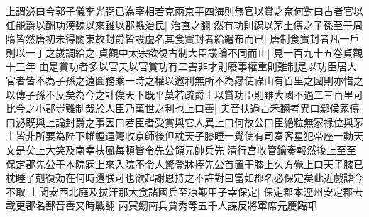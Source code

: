 上謂泌曰今郭子儀李光弼已為宰相若克兩京平四海則無官以賞之奈何對曰古者官以任能爵以酬功漢魏以來雖以郡縣治民|{
	治直之翻}
然有功則錫以茅土傳之子孫至于周隋皆然唐初未得關東故封爵皆設虚名其食實封者給繒布而已|{
	唐制食實封者凡一戶則以一丁之歲調給之}
貞觀中太宗欲復古制大臣議論不同而止|{
	見一百九十五卷貞觀十三年}
由是賞功者多以官夫以官賞功有二害非才則廢事權重則難制是以功臣居大官者皆不為子孫之遠圖務乘一時之權以邀利無所不為曏使祿山有百里之國則亦惜之以傳子孫不反矣為今之計俟天下既平莫若疏爵土以賞功臣則雖大國不過二三百里可比今之小郡豈難制哉於人臣乃萬世之利也上曰善|{
	夫音扶過古禾翻考異曰鄴侯家傳曰泌既與上論封爵之事因曰若臣者受賞與它人異上曰何故公曰臣絶粒無家禄位與茅土皆非所要為陛下帷幄運籌收京師後但枕天子膝睡一覺使有司奏客星犯帝座一動天文是矣上大笑及南幸扶風每頓皆令先公領元帥兵先清行宫收管鑰奏報然後上至至保定郡先公于本院寐上來入院不令人驚登牀捧先公首置于膝上久方覺上曰天子膝已枕睡了剋復効在何時還朕可也欲起謝恩持之不許對曰當如郡名必保定矣此近戲謔今不取}
上聞安西北庭及拔汗那大食諸國兵至凉鄯甲子幸保定|{
	保定郡本涇州安定郡去載更郡名鄯音善又時戰翻}
丙寅劒南兵賈秀等五千人謀反將軍席元慶臨卭

